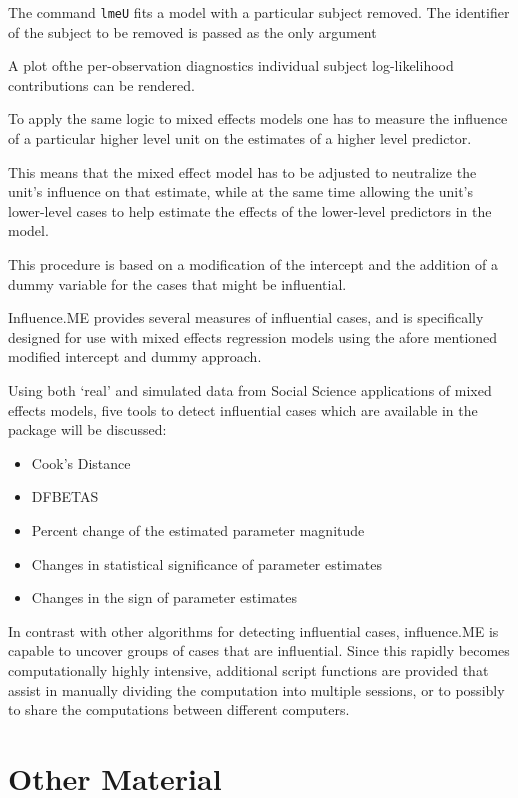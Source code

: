 \documentclass[12pt, a4paper]{report}
\begin{document}
The command \texttt{lmeU} fits a model with a particular subject removed. The identifier of the subject to be removed is passed as the only argument

A plot ofthe per-observation diagnostics individual subject log-likelihood contributions can be rendered.

To apply the same logic to mixed effects models one has to measure the influence of a particular higher
level unit on the estimates of a higher level predictor. 

This means that the mixed effect model has to
be adjusted to neutralize the unit’s influence on that estimate, while at the same time allowing the unit’s
lower-level cases to help estimate the effects of the lower-level predictors in the model. 

This procedure is
based on a modification of the intercept and the addition of a dummy variable for the cases that might be
influential. 

Influence.ME provides several measures of influential cases, and is specifically designed for use
with mixed effects regression models using the afore mentioned modified intercept and dummy approach.

Using both ‘real’ and simulated data from Social Science applications of mixed effects models, five tools to
detect influential cases which are available in the package will be discussed:
\begin{itemize}
	\item Cook’s Distance
	\item DFBETAS
	\item Percent change of the estimated parameter magnitude
	\item Changes in statistical significance of parameter estimates
	\item Changes in the sign of parameter estimates
\end{itemize}
In contrast with other algorithms for detecting influential cases, influence.ME is capable to uncover
groups of cases that are influential. Since this rapidly becomes computationally highly intensive, additional
script functions are provided that assist in manually dividing the computation into multiple sessions, or to
possibly to share the computations between different computers.

\section*{Other Material}
\end{document}
